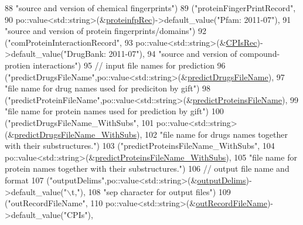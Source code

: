 \begin{DoxyCode}
88        \textcolor{stringliteral}{"source and version of chemical fingerprints"})
89       (\textcolor{stringliteral}{"proteinFingerPrintRecord"},
90        po::value<std::string>(&\hyperlink{classgift_1_1parameters_a97ed4f530fac84c7c981f4c4056dc1b1}{proteinfpRec})->default\_value(\textcolor{stringliteral}{"Pfam: 2011-07"}),
91        \textcolor{stringliteral}{"source and version of protein fingerprints/domains"})
92       (\textcolor{stringliteral}{"comProteinInteractionRecord"},
93        po::value<std::string>(&\hyperlink{classgift_1_1parameters_a214614b3b837bf7755802764d2ce04c1}{CPIsRec})->default\_value(\textcolor{stringliteral}{"DrugBank: 2011-07"}),
94        \textcolor{stringliteral}{"source and version of compound-protien interactions"})
95       \textcolor{comment}{// input file names for prediction}
96       (\textcolor{stringliteral}{"predictDrugsFileName"},po::value<std::string>(&\hyperlink{classgift_1_1parameters_ac19aca119982c0f318958d6d5744bec0}{predictDrugsFileName}),
97        \textcolor{stringliteral}{"file name for drug names used for prediciton by gift"})
98       (\textcolor{stringliteral}{"predictProteinFileName"},po::value<std::string>(&\hyperlink{classgift_1_1parameters_aaefcd06c42b5ddd57400b70cae95858d}{predictProteinsFileName}),
99        \textcolor{stringliteral}{"file name for protein names used for prediction by gift"})
100       (\textcolor{stringliteral}{"predictDrugsFileName\_WithSubs"},
101        po::value<std::string>(&\hyperlink{classgift_1_1parameters_ad28f2340e58e3f081edd6541fac12e10}{predictDrugsFileName\_WithSubs}),
102        \textcolor{stringliteral}{"file name for drugs names together with their substructures."})
103       (\textcolor{stringliteral}{"predictProteinsFileName\_WithSubs"},
104        po::value<std::string>(&\hyperlink{classgift_1_1parameters_a2da7792363c911382a3141486b0a618b}{predictProteinsFileName\_WithSubs}),
105        \textcolor{stringliteral}{"file name for protein names together with their substructures."})
106       \textcolor{comment}{// output file name and format}
107       (\textcolor{stringliteral}{"outputDelims"},po::value<std::string>(&\hyperlink{classgift_1_1parameters_a09d714bc1b27aabafe0a8d3e688049ba}{outputDelims})->default\_value(\textcolor{stringliteral}{"\(\backslash\)t,"}),
108        \textcolor{stringliteral}{"sep character for output files"})
109       (\textcolor{stringliteral}{"outRecordFileName"},
110        po::value<std::string>(&\hyperlink{classgift_1_1parameters_ae7ff6109cb437b1375466fb7dc6f1343}{outRecordFileName})->default\_value(\textcolor{stringliteral}{"CPIs"}),

\end{DoxyCode}
